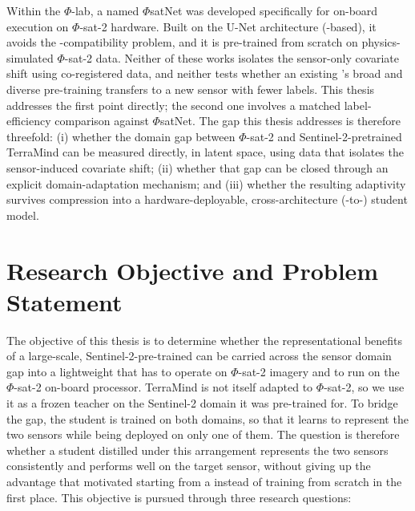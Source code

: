 Within the $\Phi$-lab, a  named $\Phi$satNet was developed specifically for on-board execution on $\Phi$-sat-2 hardware. Built on the U-Net architecture (-based), it avoids the -compatibility problem, and it is pre-trained from scratch on physics-simulated $\Phi$-sat-2 data.
Neither of these works isolates the sensor-only covariate shift using co-registered data, and neither tests whether an existing 's broad and diverse pre-training transfers to a new sensor with fewer labels.
This thesis addresses the first point directly; the second one involves a matched label-efficiency comparison against $\Phi$satNet.
The gap this thesis addresses is therefore threefold: (i) whether the domain gap between $\Phi$-sat-2 and Sentinel-2-pretrained TerraMind can be measured directly, in latent space, using data that isolates the sensor-induced covariate shift; (ii) whether that gap can be closed through an explicit domain-adaptation mechanism; and (iii) whether the resulting adaptivity survives compression into a hardware-deployable, cross-architecture (-to-) student model.

\section{Research Objective and Problem Statement}
\label{sec:research-objective}

The objective of this thesis is to determine whether the representational benefits of a large-scale, Sentinel-2-pre-trained  can be carried across the sensor domain gap into a lightweight  that has to operate on $\Phi$-sat-2 imagery and to run on the $\Phi$-sat-2 on-board processor.
TerraMind is not itself adapted to $\Phi$-sat-2, so we use it as a frozen teacher on the Sentinel-2 domain it was pre-trained for.
To bridge the gap, the student is trained on both domains, so that it learns to represent the two sensors while being deployed on only one of them.
The question is therefore whether a student distilled under this arrangement represents the two sensors consistently and performs well on the target sensor, without giving up the advantage that motivated starting from a  instead of training from scratch in the first place.
This objective is pursued through three research questions:

